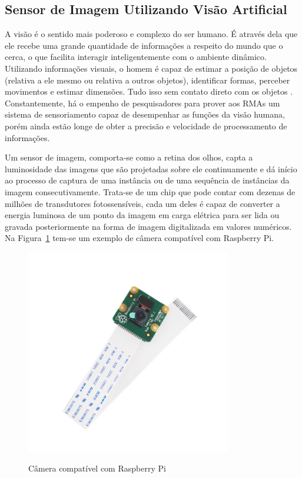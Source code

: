 \subsection{Sensor de Imagem Utilizando Visão Artificial}
\label{subsec:sensores-imagensVisão}

A visão é o sentido mais poderoso e complexo do ser humano. É através dela que ele recebe uma grande quantidade de informações a respeito do mundo que o cerca, o que facilita interagir inteligentemente com o ambiente dinâmico. Utilizando informações visuais, o homem é capaz de estimar a posição de objetos (relativa a ele mesmo ou relativa a outros objetos), identificar formas, perceber movimentos e estimar dimensões. Tudo isso sem contato direto com os objetos \cite{rogeralex1999}.
Constantemente, há o empenho de pesquisadores para prover aos RMAs um sistema de sensoriamento capaz de desempenhar as funções da visão humana, porém ainda estão longe de obter a precisão e velocidade de processamento de informações.

Um sensor de imagem, comporta-se como a retina dos olhos, capta a luminosidade das imagens que são projetadas sobre ele continuamente e dá início ao processo de captura de uma instância ou de uma sequência de instâncias da imagem consecutivamente. Trata-se de um chip que pode contar com dezenas de milhões de transdutores fotossensíveis, cada um deles é capaz de converter a energia luminosa de um ponto da imagem em carga elétrica para ser lida ou gravada posteriormente na forma de imagem digitalizada em valores numéricos. Na Figura~\ref{fig:sensor-camRaspberry} tem-se um exemplo de câmera compatível com Raspberry Pi. 

\begin{figure}[!hbtp]
  \centering
   \caption{Câmera compatível com Raspberry Pi}
    \includegraphics[width = 0.8\textwidth]{Caps/Figs/mat-met/CamRaspberry.jpg}
   \label{fig:sensor-camRaspberry}
\end{figure}

